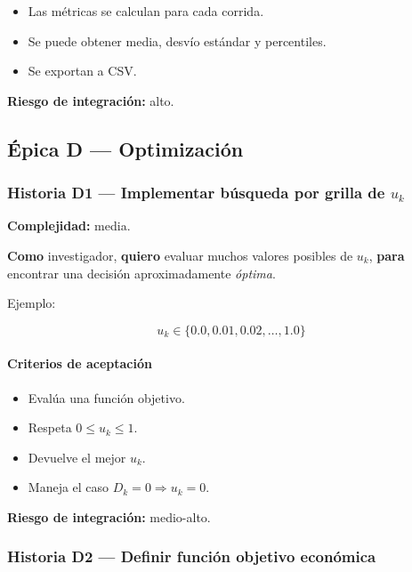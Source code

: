 \documentclass[11pt,a4paper]{article}
\begin{document}
\begin{itemize}[leftmargin=*]
    \item Las m\'etricas se calculan para cada corrida.
    \item Se puede obtener media, desv\'io est\'andar y percentiles.
    \item Se exportan a CSV.
\end{itemize}

\textbf{Riesgo de integraci\'on:} alto.

\subsection{\'Epica D --- Optimizaci\'on}

\subsubsection{Historia D1 --- Implementar b\'usqueda por grilla de $u_k$}

\textbf{Complejidad:} media.

\textbf{Como} investigador, \textbf{quiero} evaluar muchos valores posibles de $u_k$, \textbf{para} encontrar una decisi\'on aproximadamente \textit{\'optima}.

Ejemplo:

\begin{equation}
u_k \in \{0.0,0.01,0.02,\dots,1.0\}
\end{equation}

\paragraph{Criterios de aceptaci\'on}

\begin{itemize}[leftmargin=*]
    \item Eval\'ua una funci\'on objetivo.
    \item Respeta $0 \leq u_k \leq 1$.
    \item Devuelve el mejor $u_k$.
    \item Maneja el caso $D_k=0 \Rightarrow u_k=0$.
\end{itemize}

\textbf{Riesgo de integraci\'on:} medio-alto.

\subsubsection{Historia D2 --- Definir funci\'on objetivo econ\'omica}
\end{document}
